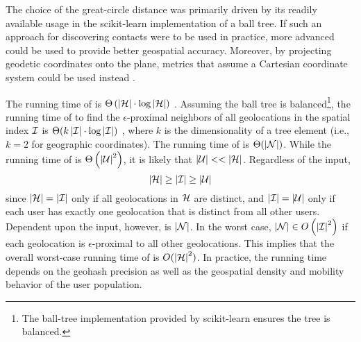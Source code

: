 The choice of the great-circle distance was primarily driven by its readily available usage in the scikit-learn \cite{sklearn2013} implementation of a ball tree. If such an approach for discovering contacts were to be used in practice, more advanced  \cite[pp. 71--130]{Lu2014} could be used to provide better geospatial accuracy. Moreover, by projecting geodetic coordinates onto the plane, metrics that assume a Cartesian coordinate system could be used instead \cite[pp. 265--326]{Lu2014}.

The running time of  is $\Theta\left(\left\vert \mathcal{H} \right\vert \cdot \log\left\vert \mathcal{H} \right\vert\right)$ \cite{Omohundro1989}. Assuming the ball tree is balanced\footnote{The ball-tree implementation provided by scikit-learn \cite{sklearn2013} ensures the tree is balanced.}, the running time of  to find the $\epsilon$-proximal neighbors of all geolocations in the spatial index $\mathcal{I}$ is $\Theta(k \left\vert \mathcal{I} \right\vert \cdot \log\left\vert \mathcal{I} \right\vert)$ , where $k$ is the dimensionality of a tree element (i.e., $k = 2$ for geographic coordinates). The running time of  is $\Theta(\left\vert \mathcal{N} \right\vert)$. While the running time of  is $\Theta\left(\left\vert \mathcal{U} \right\vert^2\right)$, it is likely that $\left\vert \mathcal{U} \right\vert << \left\vert \mathcal{H} \right\vert$. Regardless of the input,
	\begin{equation*}
		\left\vert \mathcal{H} \right\vert \geq \left\vert \mathcal{I} \right\vert \geq \left\vert \mathcal{U} \right\vert
	\end{equation*}
since $\left\vert \mathcal{H} \right\vert = \left\vert \mathcal{I} \right\vert$ only if all geolocations in $\mathcal{H}$ are distinct, and $\left\vert \mathcal{I} \right\vert = \left\vert \mathcal{U} \right\vert$ only if each user has exactly one geolocation that is distinct from all other users. Dependent upon the input, however, is $\left\vert \mathcal{N} \right\vert$. In the worst case, $\left\vert \mathcal{N} \right\vert \in O\left(\left\vert \mathcal{I} \right\vert^2\right)$ if each geolocation is $\epsilon$-proximal to all other geolocations. This implies that the overall worst-case running time of  is $O(\left\vert \mathcal{H} \right\vert^2)$. In practice, the running time depends on the geohash precision as well as the geospatial density and mobility behavior of the user population.